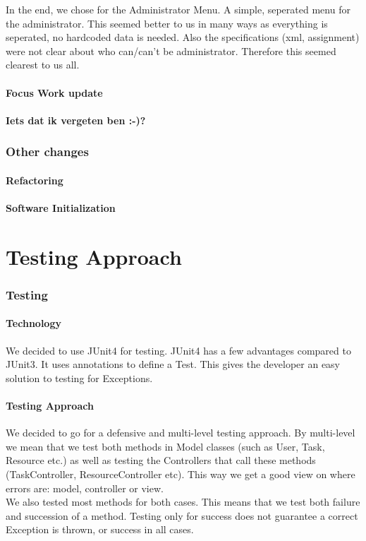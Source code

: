 			In the end, we chose for the Administrator Menu. A simple, seperated menu for the administrator. This seemed better to us in many ways as everything is seperated, no hardcoded data is needed. Also the specifications (xml, assignment) were not clear about who can/can't be administrator. Therefore this seemed clearest to us all.
	
		\subsection{Focus Work update}
		
		\subsection{Iets dat ik vergeten ben :-)?}
	
	\section{Other changes}
		\subsection{Refactoring}
		\subsection{Software Initialization}
		
\part{Testing Approach}
	
	\section{Testing}
		\subsection{Technology}
		We decided to use JUnit4 for testing.
		JUnit4 has a few advantages compared to JUnit3. It uses annotations to define a Test. This gives the developer an easy solution to testing for Exceptions.
		\subsection{Testing Approach}
		We decided to go for a defensive and multi-level testing approach.
		By multi-level we mean that we test both methods in Model classes (such as User, Task, Resource etc.) as well as testing the Controllers that call these methods (TaskController, ResourceController etc). 
		This way we get a good view on where errors are: model, controller or view.\\
		We also tested most methods for both cases. This means that we test both failure and succession of a method. Testing only for success does not guarantee a correct Exception is thrown, or success in all cases.
